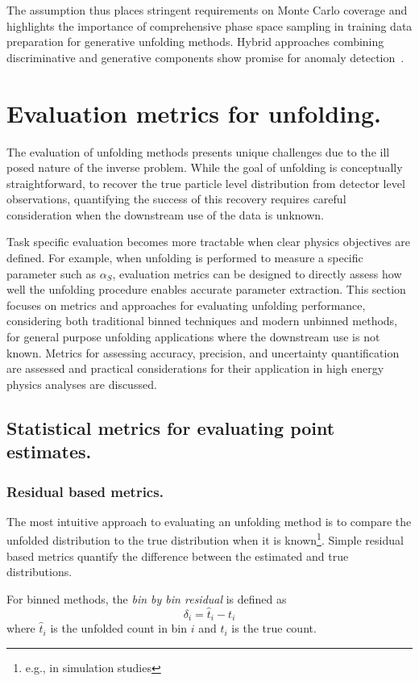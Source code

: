             The assumption thus places stringent requirements on Monte Carlo coverage and highlights the importance of comprehensive phase space sampling in training data preparation for generative unfolding methods.
            Hybrid approaches combining discriminative and generative components show promise for anomaly detection~\cite{DiMattia2019ADetection, Terjek2019AdversarialRegularization}.

\section{Evaluation metrics for unfolding.}

    The evaluation of unfolding methods presents unique challenges due to the ill posed nature of the inverse problem.
    While the goal of unfolding is conceptually straightforward, to recover the true particle level distribution from detector level observations, quantifying the success of this recovery requires careful consideration when the downstream use of the data is unknown.
    
    Task specific evaluation becomes more tractable when clear physics objectives are defined.
    For example, when unfolding is performed to measure a specific parameter such as \(\alpha_S\), evaluation metrics can be designed to directly assess how well the unfolding procedure enables accurate parameter extraction.
    This section focuses on metrics and approaches for evaluating unfolding performance, considering both traditional binned techniques and modern unbinned methods, for general purpose unfolding applications where the downstream use is not known.
    Metrics for assessing accuracy, precision, and uncertainty quantification are assessed and practical considerations for their application in high energy physics analyses are discussed.

    
    \subsection{Statistical metrics for evaluating point estimates.}
        \subsubsection{Residual based metrics.}
            The most intuitive approach to evaluating an unfolding method is to compare the unfolded distribution to the true distribution when it is known\footnote{e.g., in simulation studies}.
            Simple residual based metrics quantify the difference between the estimated and true distributions.
            \begin{definition}
                For binned methods, the \emph{bin by bin residual} is defined as
            \begin{equation}
                \delta_i = \hat{t}_i - t_i
            \end{equation}
            where \(\hat{t}_i\) is the unfolded count in bin \(i\) and \(t_i\) is the true count.
            \end{definition}
            
